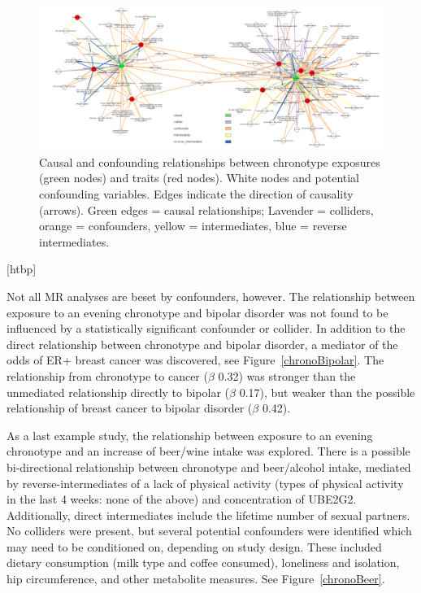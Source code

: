 \documentclass[journal,article,submit,moreauthors,pdftex]{Definitions/mdpi}
\begin{document}
\begin{figure}

\centering
	\includegraphics[width=\linewidth,keepaspectratio]{Figs/Analysis3/gBig.png}
\caption{Causal and confounding relationships between chronotype exposures (green nodes) and traits (red nodes). White nodes and potential confounding variables. Edges indicate the direction of causality (arrows). Green edges = causal relationships; Lavender = colliders, orange = confounders, yellow = intermediates, blue = reverse intermediates.}
\label{gBig}
\end{figure}[htbp]



Not all MR analyses are beset by confounders, however. The relationship between exposure to an evening chronotype and bipolar disorder was not found to be influenced by a statistically significant confounder or collider. In addition to the direct relationship between chronotype and bipolar disorder, a mediator of the odds of ER+ breast cancer was discovered, see Figure~\ref{chronoBipolar}. The relationship from chronotype to cancer ($\beta$ 0.32) was stronger than the unmediated relationship directly to bipolar ($\beta$ 0.17), but weaker than the possible relationship of breast cancer to bipolar disorder ($\beta$ 0.42). 

As a last example study, the relationship between exposure to an evening chronotype and an increase of beer/wine intake was explored. There is a possible bi-directional relationship between chronotype and beer/alcohol intake, mediated by reverse-intermediates of a lack of physical activity (types of physical activity in the last 4 weeks: none of the above) and concentration of UBE2G2. Additionally, direct intermediates include the lifetime number of sexual partners. No colliders were present, but several potential confounders were identified which may need to be conditioned on, depending on study design. These included dietary consumption (milk type and coffee consumed), loneliness and isolation, hip circumference, and other metabolite measures. See Figure~\ref{chronoBeer}.
\end{document}
